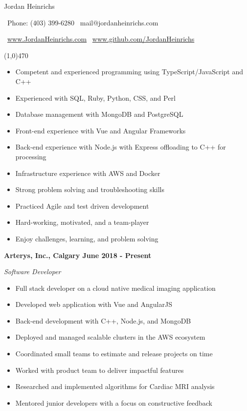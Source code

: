 \documentclass[12pt]{article}
\begin{document}
\centerline{{\Huge \sc Jordan Heinrichs}}
\medskip
\centerline{\textbullet\ Phone: (403) 399-6280 \hspace{5pt} \textbullet\ mail@jordanheinrichs.com}
\centerline{\textbullet\ \url{www.JordanHeinrichs.com}  \hspace{5pt} \textbullet\ \url{www.github.com/JordanHeinrichs}}
\noindent
\line(1,0){470}\\

\bigskip
{}
\medskip

\begin{itemize}
\item Competent and experienced programming using TypeScript/JavaScript and C++
\item Experienced with SQL, Ruby, Python, CSS, and Perl
\item Database management with MongoDB and PostgreSQL
\item Front-end experience with Vue and Angular Frameworks
\item Back-end experience with Node.js with Express offloading to C++ for processing
\item Infrastructure experience with AWS and Docker
\item Strong problem solving and troubleshooting skills
\item Practiced Agile and test driven development
\item Hard-working, motivated, and a team-player
\item Enjoy challenges, learning, and problem solving
\end{itemize}
\noindent

\bigskip
{}
\bigskip

\noindent \centerline{ \bf Arterys, Inc., Calgary \hfill June 2018 - Present}
\indent \emph{ Software Developer }
\begin{itemize}
  \item Full stack developer on a cloud native medical imaging application
  \item Developed web application with Vue and AngularJS
  \item Back-end development with C++, Node.js, and MongoDB
  \item Deployed and managed scalable clusters in the AWS ecosystem
  \item Coordinated small teams to estimate and release projects on time
  \item Worked with product team to deliver impactful features
  \item Researched and implemented algorithms for Cardiac MRI analysis
  \item Mentored junior developers with a focus on constructive feedback
\end{itemize}
\medskip
\end{document}
